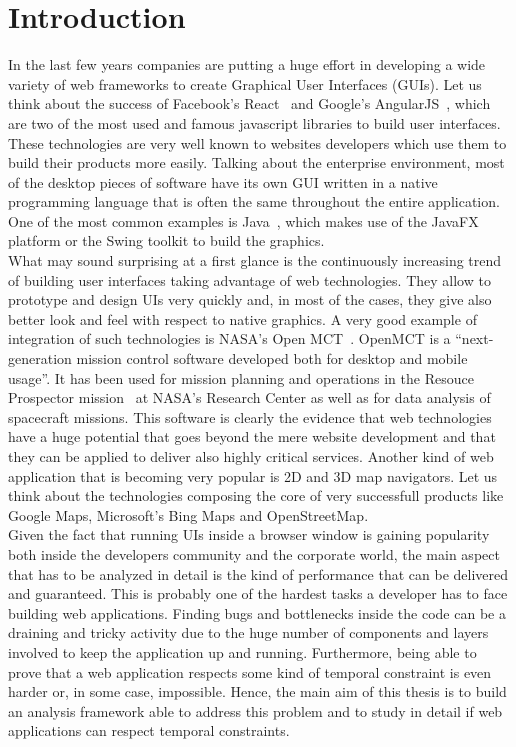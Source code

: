 \chapter{Introduction} \label{cha:intro}

In the last few years companies are putting a huge effort in developing a wide variety of 
web frameworks to create Graphical User Interfaces (GUIs). Let us think about the success of Facebook's
React~\cite{fbreact} and Google's AngularJS~\cite{angularjs}, which are two of the most
used and famous javascript libraries to build user interfaces.
These technologies are very well known to websites developers which use them to
build their products more easily.
Talking about the enterprise environment, most of the desktop pieces of software have its own GUI
written in a native programming language that is often the same throughout the entire application.
One of the most common examples is Java~\cite{gosling1995java}, which makes use of the JavaFX
platform or the Swing toolkit to build the graphics.\\
What may sound surprising at a first glance is the continuously increasing trend of 
building user interfaces taking advantage of web technologies.
They allow to prototype and design UIs very quickly and, in
most of the cases, they give also better look and feel with respect to native graphics.
A very good example of integration of such technologies is NASA's Open MCT~\cite{openmct}.
OpenMCT is a ``next-generation mission control software developed both for desktop and mobile
usage''. It has been used for mission planning and operations in the Resouce 
Prospector mission~\cite{andrews2014introducing} at NASA's Research Center as well as for
data analysis of spacecraft missions. This software is clearly the evidence that web
technologies have a huge potential that goes beyond the mere website development and that they 
can be applied to deliver also highly critical services.
Another kind of web application that is becoming very popular is 2D and 3D map navigators.
Let us think about the technologies composing the core of very successfull products like
Google Maps, Microsoft's Bing Maps and OpenStreetMap.\\
Given the fact that running UIs inside a browser window is gaining popularity both inside the
developers community and the corporate world, the main aspect that has to be analyzed
in detail is the kind of performance that can be delivered and guaranteed. This is probably one of
the hardest tasks a developer has to face building web applications. Finding bugs
and bottlenecks inside the code can be a draining and tricky activity due to the huge number
of components and layers involved to keep the application up and running. Furthermore,
being able to prove that a web application respects some kind of temporal constraint
is even harder or, in some case, impossible. Hence, the main aim of this thesis is
to build an analysis framework able to address this problem and to study in detail
if web applications can respect temporal constraints.

